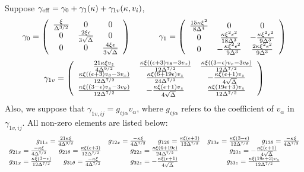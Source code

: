 \documentclass[fleqn,10pt]{InternshipReport_SI-ENS-PSL}
\begin{document}
Suppose $\gamma_{\rm{eff}} = \gamma_{0} + \gamma_{1}(\kappa) + \gamma_{1v}(\kappa,v_i)$, 
$$ \gamma_0 = \left(\begin{array}{ccc} \frac{\xi }{\Delta ^{3/2}} & 0 & 0 \\0 & \frac{2 \xi  \epsilon }{3 \sqrt{\Delta }} & 0 \\0 & 0 & \frac{4\xi \epsilon}{3\sqrt{\Delta}}  \end{array}\right) \ \ \ \ \ \ \ \ \ \  \gamma_1 = \left(\begin{array}{ccc} \frac{15 \kappa \xi ^2}{8 \Delta ^4} & 0 & 0 \\0 &  \frac{ \kappa  \xi^2  \epsilon ^2}{18 \Delta^3} & -\frac{\kappa \xi^2 \epsilon^2}{9 \Delta^3} \\0 & -\frac{\kappa \xi^2 \epsilon^2}{9 \Delta^3} &  \frac{2 \kappa \xi^2 \epsilon^2}{9 \Delta^3} \end{array}\right) $$
$$ \gamma_{1v} = \left(\begin{array}{ccc} \frac{21 \kappa\xi v_z}{4 \Delta ^{9/2}} & \frac{\kappa\xi  \left((\epsilon +3) v_{\theta }-3 v_x\right)}{12 \Delta ^{7/2}} & \frac{\kappa\xi  \left( (3 - \epsilon) v_x - 3 v_{\theta} \right)}{12 \Delta ^{7/2}} \\ \frac{\kappa\xi  \left((\epsilon +3) v_{\theta }-3 v_x\right)}{12 \Delta ^{7/2}} & \frac{\kappa\xi (6 + 19 \epsilon) v_z}{24 \Delta^{7/2}} & - \frac{\kappa \xi (\epsilon+1) v_z}{4 \sqrt{\Delta}} \\ \frac{\kappa\xi  \left( (3 - \epsilon) v_x - 3 v_{\theta} \right)}{12 \Delta ^{7/2}} & - \frac{\kappa \xi (\epsilon+1) v_z}{4 \sqrt{\Delta}} & \frac{\kappa\xi (19 \epsilon + 3) v_z}{12 \Delta^{7/2}} \end{array}\right) $$
Also, we suppose that $\gamma_{1v,ij} = g_{ij\alpha} v_\alpha$, where $g_{ij\alpha}$ refers to the coefficient of $v_\alpha$ in $\gamma_{1v,ij}$. All non-zero elements are listed below: %
$$ \begin{array}{ccc} 
g_{11z} = \frac{21 \kxi}{4 \Delta ^{9/2}} & 
g_{12x} = \frac{ - \kxi}{4 \Delta ^{7/2}} \fives g_{12\tta} = \frac{\kxi (\epsilon +3) }{12 \Delta ^{7/2}} & 
g_{13x} = \frac{\kxi (3 - \epsilon)}{12 \Delta ^{7/2}} \fives  g_{13\tta} = \frac{ - \kxi }{4 \Delta ^{7/2}} \\ %
g_{21x} = \frac{ - \kxi}{4 \Delta ^{7/2}} \fives g_{21\tta} = \frac{\kxi (\epsilon +3) }{12 \Delta ^{7/2}} & 
g_{22z} = \frac{\kappa\xi (6 + 19 \eps) }{24 \Delta^{7/2}} & 
g_{23z} = - \frac{\kappa \xi (\eps+1) }{4 \sqrt{\Delta}} \\ %
g_{31x} = \frac{\kxi (3 - \epsilon)}{12 \Delta ^{7/2}} \fives  g_{31\tta} = \frac{ - \kxi }{4 \Delta ^{7/2}} &
g_{32z} = - \frac{\kappa \xi (\eps+1)}{4 \sqrt{\Delta}} &
g_{33z} = \frac{\kappa\xi (19 \eps + 3) v_z}{12 \Delta^{7/2}} \end{array} $$
 
\end{document}
